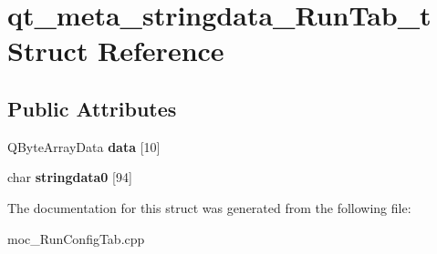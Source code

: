 \hypertarget{structqt__meta__stringdata__RunTab__t}{}\section{qt\+\_\+meta\+\_\+stringdata\+\_\+\+Run\+Tab\+\_\+t Struct Reference}
\label{structqt__meta__stringdata__RunTab__t}
\subsection*{Public Attributes}
\begin{DoxyCompactItemize}
\item 
\mbox{\label{structqt__meta__stringdata__RunTab__t_a6f6c97baa156b1e17e04ddac9f025e70}} 
Q\+Byte\+Array\+Data {\bfseries data} \mbox{[}10\mbox{]}
\item 
\mbox{\label{structqt__meta__stringdata__RunTab__t_a6138f3ebee1549de7407a802ff857809}} 
char {\bfseries stringdata0} \mbox{[}94\mbox{]}
\end{DoxyCompactItemize}


The documentation for this struct was generated from the following file\+:\begin{DoxyCompactItemize}
\item 
moc\+\_\+\+Run\+Config\+Tab.\+cpp\end{DoxyCompactItemize}
